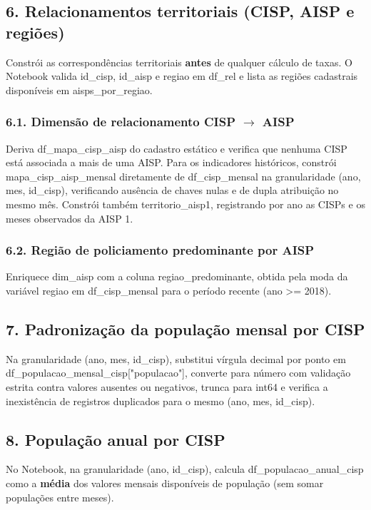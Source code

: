 \documentclass[11pt,a4paper]{article}
\newcommand{\code}[1]{{\ttfamily\footnotesize\allowbreak #1}}
\begin{document}
\subsection{6. Relacionamentos territoriais (CISP, AISP e regiões)}
Constrói as correspondências territoriais \textbf{antes} de qualquer cálculo de taxas. O Notebook valida \code{id\_cisp}, \code{id\_aisp} e \code{regiao} em \code{df\_rel} e lista as regiões cadastrais disponíveis em \code{aisps\_por\_regiao}.

\subsubsection*{6.1. Dimensão de relacionamento CISP $\rightarrow$ AISP}
Deriva \code{df\_mapa\_cisp\_aisp} do cadastro estático e verifica que nenhuma CISP está associada a mais de uma AISP. Para os indicadores históricos, constrói \code{mapa\_cisp\_aisp\_mensal} diretamente de \code{df\_cisp\_mensal} na granularidade \code{(ano, mes, id\_cisp)}, verificando ausência de chaves nulas e de dupla atribuição no mesmo mês. Constrói também \code{territorio\_aisp1}, registrando por ano as CISPs e os meses observados da AISP 1.

\subsubsection*{6.2. Região de policiamento predominante por AISP}
Enriquece \code{dim\_aisp} com a coluna \code{regiao\_predominante}, obtida pela moda da variável \code{regiao} em \code{df\_cisp\_mensal} para o período recente (\code{ano >= 2018}).

\subsection{7. Padronização da população mensal por CISP}
Na granularidade \code{(ano, mes, id\_cisp)}, substitui vírgula decimal por ponto em \code{df\_populacao\_mensal\_cisp["populacao"]}, converte para número com validação estrita contra valores ausentes ou negativos, trunca para \code{int64} e verifica a inexistência de registros duplicados para o mesmo \code{(ano, mes, id\_cisp)}.

\subsection{8. População anual por CISP}
No Notebook, na granularidade \code{(ano, id\_cisp)}, calcula \code{df\_populacao\_anual\_cisp} como a \textbf{média} dos valores mensais disponíveis de população (sem somar populações entre meses).
\end{document}

